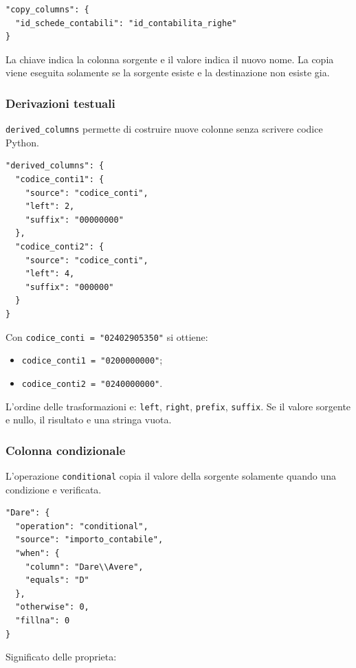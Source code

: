 \begin{lstlisting}
"copy_columns": {
  "id_schede_contabili": "id_contabilita_righe"
}
\end{lstlisting}

La chiave indica la colonna sorgente e il valore indica il nuovo nome. La
copia viene eseguita solamente se la sorgente esiste e la destinazione non
esiste gia.

\subsubsection{Derivazioni testuali}

\texttt{derived\_columns} permette di costruire nuove colonne senza scrivere
codice Python.

\begin{lstlisting}
"derived_columns": {
  "codice_conti1": {
    "source": "codice_conti",
    "left": 2,
    "suffix": "00000000"
  },
  "codice_conti2": {
    "source": "codice_conti",
    "left": 4,
    "suffix": "000000"
  }
}
\end{lstlisting}

Con \texttt{codice\_conti = "02402905350"} si ottiene:

\begin{itemize}
  \item \texttt{codice\_conti1 = "0200000000"};
  \item \texttt{codice\_conti2 = "0240000000"}.
\end{itemize}

L'ordine delle trasformazioni e: \texttt{left}, \texttt{right},
\texttt{prefix}, \texttt{suffix}. Se il valore sorgente e nullo, il risultato
e una stringa vuota.

\subsubsection{Colonna condizionale}

L'operazione \texttt{conditional} copia il valore della sorgente solamente
quando una condizione e verificata.

\begin{lstlisting}
"Dare": {
  "operation": "conditional",
  "source": "importo_contabile",
  "when": {
    "column": "Dare\\Avere",
    "equals": "D"
  },
  "otherwise": 0,
  "fillna": 0
}
\end{lstlisting}

Significato delle proprieta:

